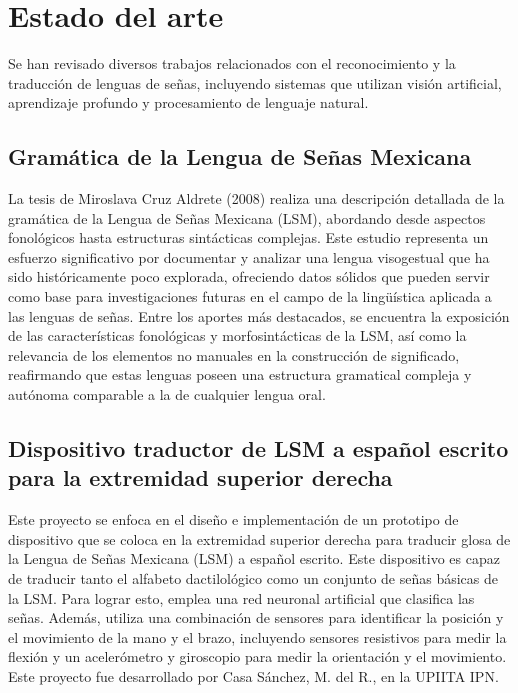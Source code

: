 \chapter{Estado del arte}

Se han revisado diversos trabajos relacionados con el reconocimiento y la traducción de lenguas de señas, incluyendo sistemas que utilizan visión artificial, aprendizaje profundo y procesamiento de lenguaje natural.

\section {Gramática de la Lengua de Señas Mexicana \cite{ref42}}

La tesis de Miroslava Cruz Aldrete (2008) realiza una descripción detallada de la gramática de la Lengua de Señas Mexicana (LSM), abordando desde aspectos fonológicos hasta estructuras sintácticas complejas. Este estudio representa un esfuerzo significativo por documentar y analizar una lengua visogestual que ha sido históricamente poco explorada, ofreciendo datos sólidos que pueden servir como base para investigaciones futuras en el campo de la lingüística aplicada a las lenguas de señas. Entre los aportes más destacados, se encuentra la exposición de las características fonológicas y morfosintácticas de la LSM, así como la relevancia de los elementos no manuales en la construcción de significado, reafirmando que estas lenguas poseen una estructura gramatical compleja y autónoma comparable a la de cualquier lengua oral.

\section{Dispositivo traductor de LSM a español escrito para la extremidad superior derecha \cite{ref8}}

Este proyecto se enfoca en el diseño e implementación de un prototipo de dispositivo que se coloca en la extremidad superior derecha para traducir glosa de la Lengua de Señas Mexicana (LSM) a español escrito. Este dispositivo es capaz de traducir tanto el alfabeto dactilológico como un conjunto de señas básicas de la LSM. Para lograr esto, emplea una red neuronal artificial que clasifica las señas. Además, utiliza una combinación de sensores para identificar la posición y el movimiento de la mano y el brazo, incluyendo sensores resistivos para medir la flexión y un acelerómetro y giroscopio para medir la orientación y el movimiento.  Este proyecto fue desarrollado por Casa Sánchez, M. del R., en la UPIITA IPN.


